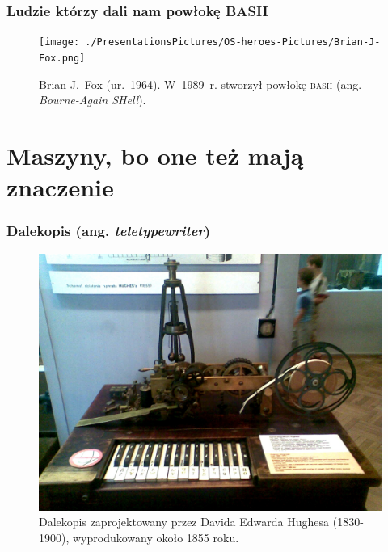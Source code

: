 \documentclass[10pt,t]{beamer}
\begin{document}
\begin{frame}
  \frametitle{Ludzie którzy dali nam powłokę BASH}


  \begin{figure}

    \centering


    \texttt{[image: ./PresentationsPictures/OS-heroes-Pictures/Brian-J-Fox.png]}

    \caption{Brian J.~Fox (ur.~1964). W~1989~r. stworzył powłokę
      \textsc{bash} (ang. \textit{Bourne-Again SHell}).}

    \label{fig:Brain-J-Fox}

  \end{figure}

\end{frame}










\section{Maszyny, bo one też mają znaczenie}



\begin{frame}
  \frametitle{Dalekopis (ang. \textit{teletypewriter})}


  \begin{figure}

    \centering


    \includegraphics[scale=0.6]
    {./PresentationsPictures/Machines-Pictures/Hughes-telegraph.jpeg}

    \caption{Dalekopis zaprojektowany przez Davida Edwarda Hughesa
      (1830-1900), wyprodukowany około 1855 roku.}

    \label{fig:Dalekopis-Hughesa}

  \end{figure}

\end{frame}
\end{document}
